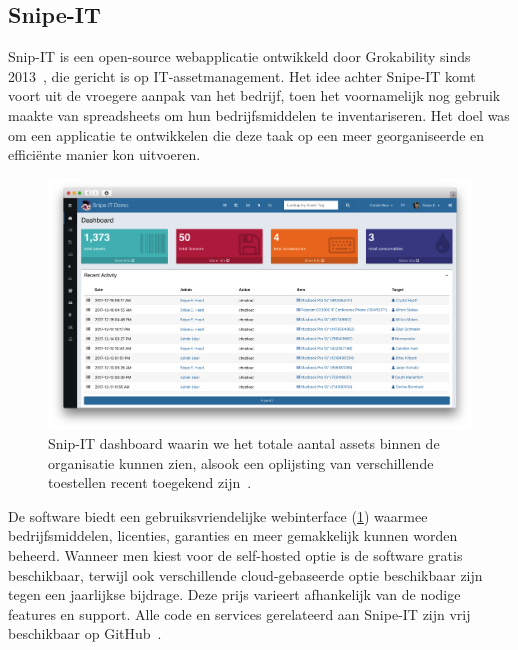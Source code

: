 \subsection{Snipe-IT}
\label{sub:snipe-it}

Snip-IT is een open-source webapplicatie ontwikkeld door Grokability sinds 2013~\autocite{snipe-it-introduction}, die gericht is op IT-assetmanagement.
Het idee achter Snipe-IT komt voort uit de vroegere aanpak van het bedrijf, toen het voornamelijk nog gebruik maakte van spreadsheets om hun bedrijfsmiddelen te inventariseren.
Het doel was om een applicatie te ontwikkelen die deze taak op een meer georganiseerde en effici\"ente manier kon uitvoeren.

\begin{figure}[h!]
    \includegraphics[width=\textwidth]
    {./graphics/snipe-dashboard.png}
    \caption{\label{fig:snipe-it-dashboard}Snip-IT dashboard waarin we het totale aantal assets binnen de organisatie kunnen zien, alsook een oplijsting van verschillende toestellen recent toegekend zijn~\autocite{snipe-it-dashboard}.}
\end{figure}

De software biedt een gebruiksvriendelijke webinterface (\ref{fig:snipe-it-dashboard}) waarmee bedrijfsmiddelen, licenties, garanties en meer gemakkelijk kunnen worden beheerd.
Wanneer men kiest voor de self-hosted optie is de software gratis beschikbaar, terwijl ook verschillende cloud-gebaseerde optie beschikbaar zijn tegen een jaarlijkse bijdrage.
Deze prijs varieert afhankelijk van de nodige features en support.
Alle code en services gerelateerd aan Snipe-IT zijn vrij beschikbaar op GitHub~\autocite{snipe-it-github}.

